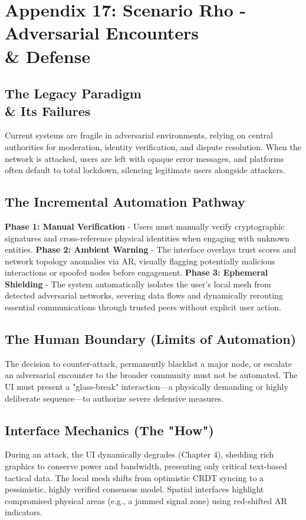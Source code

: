\section{Appendix 17: Scenario Rho - Adversarial Encounters \\\& Defense}

\subsection{The Legacy Paradigm \\\& Its Failures}
Current systems are fragile in adversarial environments, relying on central authorities for moderation, identity verification, and dispute resolution. When the network is attacked, users are left with opaque error messages, and platforms often default to total lockdown, silencing legitimate users alongside attackers.

\subsection{The Incremental Automation Pathway}
\textbf{Phase 1: Manual Verification} - Users must manually verify cryptographic signatures and cross-reference physical identities when engaging with unknown entities.
\textbf{Phase 2: Ambient Warning} - The interface overlays trust scores and network topology anomalies via AR, visually flagging potentially malicious interactions or spoofed nodes before engagement.
\textbf{Phase 3: Ephemeral Shielding} - The system automatically isolates the user's local mesh from detected adversarial networks, severing data flows and dynamically rerouting essential communications through trusted peers without explicit user action.

\subsection{The Human Boundary (Limits of Automation)}
The decision to counter-attack, permanently blacklist a major node, or escalate an adversarial encounter to the broader community must not be automated. The UI must present a "glass-break" interaction—a physically demanding or highly deliberate sequence—to authorize severe defensive measures.

\subsection{Interface Mechanics (The "How")}
During an attack, the UI dynamically degrades (Chapter 4), shedding rich graphics to conserve power and bandwidth, presenting only critical text-based tactical data. The local mesh shifts from optimistic CRDT syncing to a pessimistic, highly verified consensus model. Spatial interfaces highlight compromised physical areas (e.g., a jammed signal zone) using red-shifted AR indicators.

